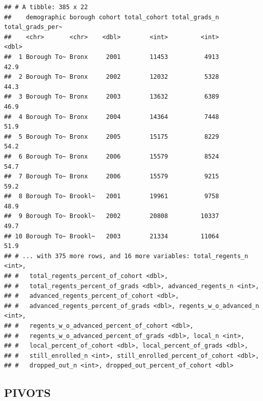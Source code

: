 \documentclass[
  english,
  man, fleqn, noextraspace]{apa6}
\newenvironment{Shaded}{\begin{snugshade}}{\end{snugshade}}
\newcommand{\KeywordTok}[1]{\textcolor[rgb]{0.13,0.29,0.53}{\textbf{#1}}}
\newcommand{\NormalTok}[1]{#1}
\newcommand{\OperatorTok}[1]{\textcolor[rgb]{0.81,0.36,0.00}{\textbf{#1}}}
\newcommand{\StringTok}[1]{\textcolor[rgb]{0.31,0.60,0.02}{#1}}
\begin{document}
\begin{Shaded}
\end{Shaded}

\begin{verbatim}
## # A tibble: 385 x 22
##    demographic borough cohort total_cohort total_grads_n total_grads_per~
##    <chr>       <chr>    <dbl>        <int>         <int>            <dbl>
##  1 Borough To~ Bronx     2001        11453          4913             42.9
##  2 Borough To~ Bronx     2002        12032          5328             44.3
##  3 Borough To~ Bronx     2003        13632          6389             46.9
##  4 Borough To~ Bronx     2004        14364          7448             51.9
##  5 Borough To~ Bronx     2005        15175          8229             54.2
##  6 Borough To~ Bronx     2006        15579          8524             54.7
##  7 Borough To~ Bronx     2006        15579          9215             59.2
##  8 Borough To~ Brookl~   2001        19961          9758             48.9
##  9 Borough To~ Brookl~   2002        20808         10337             49.7
## 10 Borough To~ Brookl~   2003        21334         11064             51.9
## # ... with 375 more rows, and 16 more variables: total_regents_n <int>,
## #   total_regents_percent_of_cohort <dbl>,
## #   total_regents_percent_of_grads <dbl>, advanced_regents_n <int>,
## #   advanced_regents_percent_of_cohort <dbl>,
## #   advanced_regents_percent_of_grads <dbl>, regents_w_o_advanced_n <int>,
## #   regents_w_o_advanced_percent_of_cohort <dbl>,
## #   regents_w_o_advanced_percent_of_grads <dbl>, local_n <int>,
## #   local_percent_of_cohort <dbl>, local_percent_of_grads <dbl>,
## #   still_enrolled_n <int>, still_enrolled_percent_of_cohort <dbl>,
## #   dropped_out_n <int>, dropped_out_percent_of_cohort <dbl>
\end{verbatim}

\hypertarget{pivots}{%
\subsection{PIVOTS}\label{pivots}}
\end{document}
